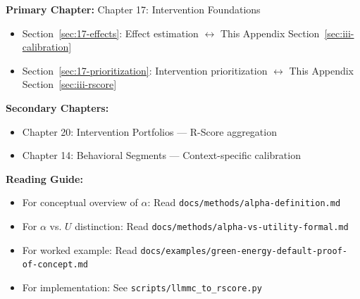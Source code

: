 %
%
%
%
%


\begin{tcolorbox}[colback=purple!5!white, colframe=purple!75!black,
    title=Chapter Linkage]

\textbf{Primary Chapter:} Chapter 17: Intervention Foundations
\begin{itemize}[nosep]
\item Section~\ref{sec:17-effects}: Effect estimation $\leftrightarrow$ This Appendix Section~\ref{sec:iii-calibration}
\item Section~\ref{sec:17-prioritization}: Intervention prioritization $\leftrightarrow$ This Appendix Section~\ref{sec:iii-rscore}
\end{itemize}

\textbf{Secondary Chapters:}
\begin{itemize}[nosep]
\item Chapter 20: Intervention Portfolios --- R-Score aggregation
\item Chapter 14: Behavioral Segments --- Context-specific calibration
\end{itemize}

\textbf{Reading Guide:}
\begin{itemize}[nosep]
\item For conceptual overview of $\alpha$: Read \texttt{docs/methods/alpha-definition.md}
\item For $\alpha$ vs. $U$ distinction: Read \texttt{docs/methods/alpha-vs-utility-formal.md}
\item For worked example: Read \texttt{docs/examples/green-energy-default-proof-of-concept.md}
\item For implementation: See \texttt{scripts/llmmc\_to\_rscore.py}
\end{itemize}

\end{tcolorbox}

